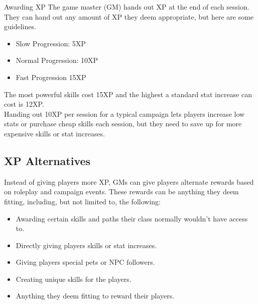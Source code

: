 \begin{multicols}{2}
\begin{paperbox}{Awarding XP}
	The game master (GM) hands out XP at the end of each session. They can hand out any amount of XP they deem appropriate, but here are some guidelines.
	\begin{itemize}
	\item Slow Progression: 5XP
	\item Normal Progression: 10XP
	\item Fast Progression 15XP
	\end{itemize}
	The most powerful skills cost 15XP and the highest a standard stat increase can cost is 12XP. \\
	Handing out 10XP per session for a typical campaign lets players increase low stats or purchase cheap skills each session, but they need to save up for more expensive skills or stat increases.
\end{paperbox}
	
	
\subsection{XP Alternatives}
Instead of giving players more XP, GMs can give players alternate rewards based on roleplay and campaign events. These rewards can be anything they deem fitting, including, but not limited to, the following:
 
\begin{itemize}
\item Awarding certain skills and paths their class normally wouldn’t have access to.
\item Directly giving players skills or stat increases.
\item Giving players special pets or NPC followers.
\item Creating unique skills for the players. 
\item Anything they deem fitting to reward their players.
\end{itemize}


\end{multicols}
